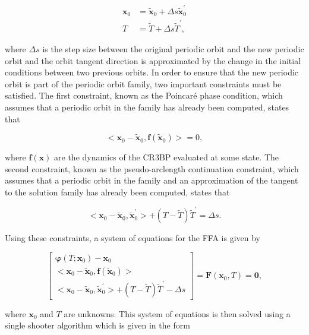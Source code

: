 \documentclass[11pt]{article} %
\begin{document}
\begin{align}
	\bm{x}_0 &= \tilde{\bm{x}}_0 + \Delta s\tilde{\bm{x}}_0^{\prime} \\
	T &= \tilde{T} + \Delta s\tilde{T}^{\prime},
\end{align}

\noindent
where $\Delta s$ is the step size between the original periodic orbit and the new periodic orbit and the orbit tangent direction is approximated by the change in the initial conditions between two previous orbits. In order to ensure that the new periodic orbit is part of the periodic orbit family, two important constraints must be satisfied. The first constraint, known as the Poincar\'{e} phase condition, which assumes that a periodic orbit in the family has already been computed, states that 

\begin{equation}
	<\bm{x}_0 - \tilde{\bm{x}}_0, \bm{f}\left(\tilde{\bm{x}}_0\right)> = 0,
\end{equation}

\noindent
where $\bm{f}\left(\bm{x}\right)$ are the dynamics of the CR3BP evaluated at some state. The second constraint, known as the pseudo-arclength continuation constraint, which assumes that a periodic orbit in the family and an approximation of the tangent to the solution family has already been computed, states that

\begin{equation}
<\bm{x}_0 - \tilde{\bm{x}}_0, \tilde{\bm{x}}_0^{\prime}> + \left(T-\tilde{T}\right)\tilde{T}^{\prime} = \Delta s.
\end{equation}

\noindent
Using these constraints, a system of equations for the FFA is given by

\doublespace
\begin{equation}
	\label{e:ffa_constraints}
	\begin{bmatrix}
	\bm{\varphi}\left(T;\bm{x}_0\right) - \bm{x}_0 \\
	<\bm{x}_0 - \tilde{\bm{x}}_0, \bm{f}\left(\tilde{\bm{x}}_0\right)> \\
	<\bm{x}_0 - \tilde{\bm{x}}_0, \tilde{\bm{x}}_0^{\prime}> + \left(T-\tilde{T}\right)\tilde{T}^{\prime} - \Delta s
	\end{bmatrix} = \bm{F}\left(\bm{x}_0, T\right) = \bm{0},
\end{equation}
\singlespace

\noindent
where $\bm{x}_0$ and $T$ are unknowns. This system of equations is then solved using a single shooter algorithm \cite{NumericalRecipies2007} which is given in the form
\end{document}
